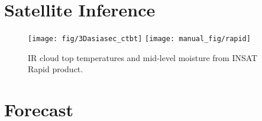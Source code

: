 \documentclass[10pt,usletter]{article} %
\begin{document}



\section{Satellite Inference}
\begin{figure}[H]
\centering
\texttt{[image: fig/3Dasiasec\_ctbt]}
\texttt{[image: manual\_fig/rapid]}
\caption{IR cloud top temperatures and mid-level moisture from INSAT Rapid product.}
\end{figure}






\section{Forecast}



\end{document}
